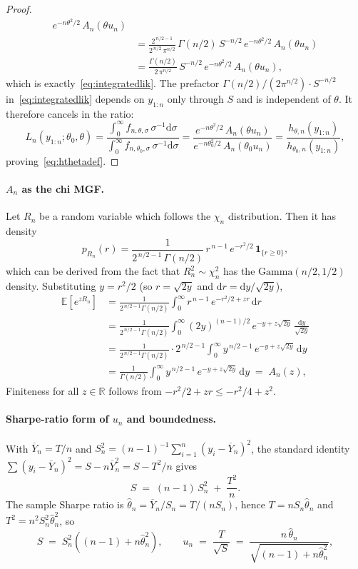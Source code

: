\documentclass[12pt, a4paper]{report}
\newcommand{\E}{\mathbb{E}}
\newcommand{\diff}{\mathrm{d}}
\newcommand{\1}{\mathbf{1}}
\begin{document}
\begin{proof}
\begin{align*}
   e^{-n\theta^{2}/2}\,A_n(\theta u_n)\\
&= \frac{2^{\,n/2-1}}{2^{\,n/2}\,\pi^{n/2}}\,\Gamma(n/2)\,S^{-n/2}\,
   e^{-n\theta^{2}/2}\,A_n(\theta u_n)\\
&= \frac{\Gamma(n/2)}{2\,\pi^{n/2}}\,S^{-n/2}\,
   e^{-n\theta^{2}/2}\,A_n(\theta u_n),
\end{align*}
which is exactly~\eqref{eq:integratedlik}. The prefactor $\Gamma(n/2)/(2\pi^{n/2})\cdot S^{-n/2}$
in~\eqref{eq:integratedlik} depends on $y_{1:n}$ only through $S$ and is independent of $\theta$. It therefore cancels in the ratio:
\[
L_n(y_{1:n};\theta_0,\theta)
=\frac{\int_{0}^{\infty}\! f_{n,\theta,\sigma}\,\sigma^{-1}\diff\sigma}
      {\int_{0}^{\infty}\! f_{n,\theta_0,\sigma}\,\sigma^{-1}\diff\sigma}
=\frac{e^{-n\theta^{2}/2}\,A_n(\theta u_n)}
      {e^{-n\theta_0^{2}/2}\,A_n(\theta_0 u_n)}
=\frac{h_{\theta,n}(y_{1:n})}{h_{\theta_0,n}(y_{1:n})},
\]
proving~\eqref{eq:hthetadef}. 
\end{proof}

\paragraph{$A_n$ as the chi MGF.} Let $R_n$ be a random variable which follows the $\chi_n$ distribution. Then it has density
\[
p_{R_n}(r)
=\frac{1}{2^{\,n/2-1}\,\Gamma(n/2)}\,
  r^{\,n-1}\,e^{-r^{2}/2}\,\1_{\{r\geq 0\}},
\]
which can be derived from the fact that $R_n^{2}\sim\chi^{2}_n$ has the $\mathrm{Gamma}(n/2,1/2)$ density. Substituting
$y=r^{2}/2$ (so $r=\sqrt{2y}$ and $\diff r=\diff y/\sqrt{2y}$),
\allowdisplaybreaks
\begin{align*}
\E\!\left[e^{zR_n}\right]
&=\frac{1}{2^{\,n/2-1}\Gamma(n/2)}
  \int_{0}^{\infty}\! r^{\,n-1}\,e^{-r^{2}/2 + zr}\,\diff r\\
&=\frac{1}{2^{\,n/2-1}\Gamma(n/2)}
  \int_{0}^{\infty}\! (2y)^{(n-1)/2}\,e^{-y+z\sqrt{2y}}\,\frac{\diff y}{\sqrt{2y}}\\
&=\frac{1}{2^{\,n/2-1}\Gamma(n/2)}\cdot 2^{\,n/2-1}
  \int_{0}^{\infty}\! y^{\,n/2-1}\,e^{-y+z\sqrt{2y}}\,\diff y\\
&=\frac{1}{\Gamma(n/2)}
  \int_{0}^{\infty}\! y^{\,n/2-1}\,e^{-y+z\sqrt{2y}}\,\diff y
  \;=\; A_n(z),
\end{align*}
Finiteness for all $z\in\mathbb{R}$ follows from $-r^{2}/2+zr\leq -r^{2}/4+z^{2}$.

\paragraph{Sharpe-ratio form of $u_n$ and boundedness.} With $\overline{Y}_n=T/n$ and
$S_n^{2}=(n-1)^{-1}\sum_{i=1}^{n}(y_i-\overline{Y}_n)^{2}$, the standard
identity $\sum(y_i-\overline{Y}_n)^{2}=S-n\overline{Y}_n^{2}=S-T^{2}/n$
gives
\[
S \;=\; (n-1)\,S_n^{2} \;+\; \frac{T^{2}}{n}.
\]
The sample Sharpe ratio is
$\widehat{\theta}_n=\overline{Y}_n/S_n=T/(nS_n)$, hence
$T=nS_n\widehat{\theta}_n$ and $T^{2}=n^{2}S_n^{2}\widehat{\theta}_n^{2}$, so
\[
S \;=\; S_n^{2}\!\left((n-1)+n\widehat{\theta}_n^{2}\right),
\qquad
u_n \;=\; \frac{T}{\sqrt{S}}
\;=\; \frac{n\,\widehat{\theta}_n}{\sqrt{(n-1)+n\widehat{\theta}_n^{2}}},
\]
\end{document}
